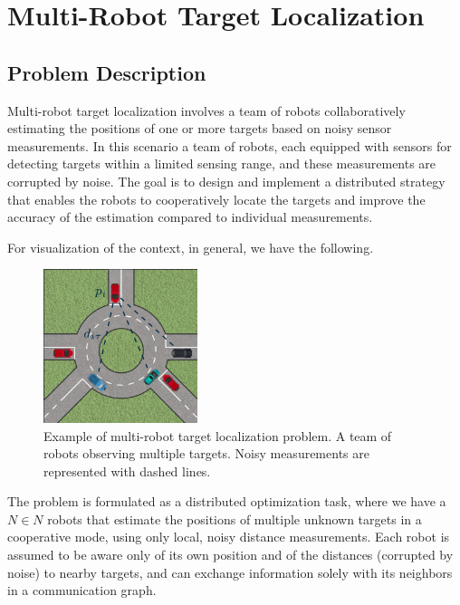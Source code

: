 \chapter{Multi-Robot Target Localization}



\section*{Problem Description}

Multi-robot target localization involves a team of robots collaboratively estimating the positions of one or more targets based on noisy 
sensor measurements. In this scenario a team of robots, each equipped with sensors for detecting targets within a limited sensing range, 
and these measurements are corrupted by noise. 
The goal is to design and implement a distributed strategy that enables the robots to cooperatively locate the targets and improve the 
accuracy of the estimation compared to individual measurements.


For visualization of the context, in general, we have the following.


\begin{figure}[h]
    \centering
    \includegraphics[width=0.4\textwidth]{img/Cap1/multi_robot_localization.png}
    \caption{Example of multi-robot target localization problem. A team of robots observing multiple targets. 
    Noisy measurements are 
    represented with dashed lines.}
    \label{fig:multi_robot_localization}
\end{figure}

\noindent
The problem is formulated as a distributed optimization task,
where we have a $N \in N $ robots that estimate the positions of multiple unknown targets in a cooperative mode, using only local, noisy distance measurements.
Each robot is assumed to be aware only of its own position and of the distances (corrupted by noise) to nearby targets, and can exchange information solely with its 
neighbors in a communication graph.


